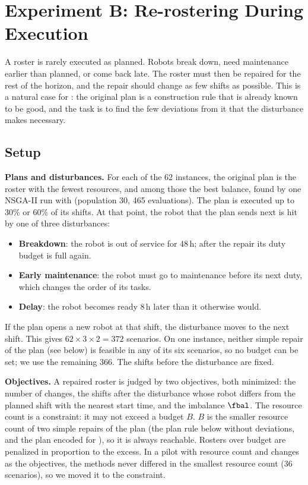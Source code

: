 \section{Experiment B: Re-rostering During Execution}
\label{sec:exp-rerostering}


A roster is rarely executed as planned.
Robots break down, need maintenance earlier than planned, or come back late.
The roster must then be repaired for the rest of the horizon, and the repair should change as few shifts as possible.
This is a natural case for \SDD: the original plan is a construction rule that is already known to be good,
and the task is to find the few deviations from it that the disturbance makes necessary.

\subsection{Setup}
\label{sec:exp-rerostering:setup}

\textbf{Plans and disturbances.}
For each of the 62 instances, the original plan is the roster with the fewest resources, and among those the best balance,
found by one NSGA-II run with  (population 30, 465 evaluations).
The plan is executed up to 30\% or 60\% of its shifts.
At that point, the robot that the plan sends next is hit by one of three disturbances:
\begin{itemize}
  \item \textbf{Breakdown}: the robot is out of service for 48\,h; after the repair its duty budget is full again.
  \item \textbf{Early maintenance}: the robot must go to maintenance before its next duty, which changes the order of its tasks.
  \item \textbf{Delay}: the robot becomes ready 8\,h later than it otherwise would.
\end{itemize}
If the plan opens a new robot at that shift, the disturbance moves to the next shift.
This gives $62 \times 3 \times 2 = 372$ scenarios.
On one instance, neither simple repair of the plan (see below) is feasible in any of its six scenarios, so no budget can be set; we use the remaining 366.
The shifts before the disturbance are fixed.

\textbf{Objectives.}
A repaired roster is judged by two objectives, both minimized:
the number of changes, \ie the shifts after the disturbance whose robot differs from the planned shift with the nearest start time,
and the imbalance $\fbal$.
The resource count is a constraint: it may not exceed a budget $B$.
$B$ is the smaller resource count of two simple repairs of the plan (the plan rule below without deviations, and the plan encoded for ),
so it is always reachable.
Rosters over budget are penalized in proportion to the excess.
In a pilot with resource count and changes as the objectives, the methods never differed in the smallest resource count (36 scenarios), so we moved it to the constraint.

